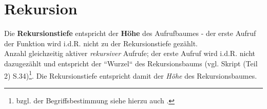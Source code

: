 \section{Rekursion}

Die \textbf{Rekursionstiefe} entspricht der \textbf{Höhe} des Aufrufbaumes - der erste Aufruf der Funktion wird i.d.R. nicht zu der Rekursionstiefe gezählt.\\

\noindent
Anzahl gleichzeitig aktiver \textit{rekursiver} Aufrufe; der erste Aufruf wird i.d.R. nicht dazugezählt und entspricht der ``Wurzel`` des Rekursionsbaums (vgl. Skript (Teil 2) S.34)\footnote{
bzgl. der Begriffsbestimmung siehe hierzu auch \cite[144 f.]{CK75}.
}.
Die Rekursionstiefe entspricht damit der \textit{Höhe} des Rekursionsbaumes.